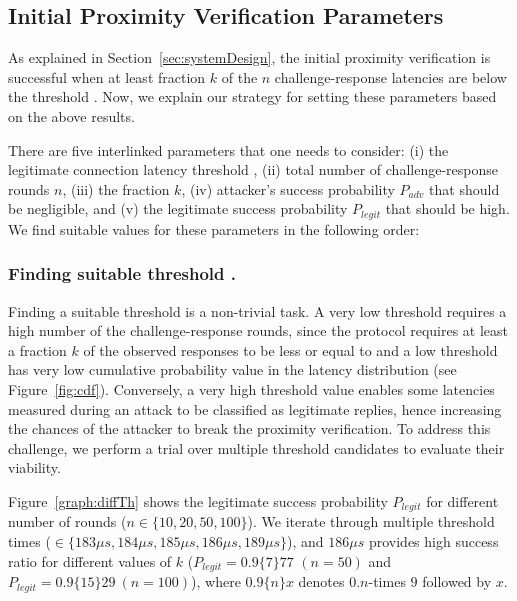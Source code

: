 \subsection{Initial Proximity Verification Parameters}
\label{sec:evaluation:parameters}

As explained in Section~\ref{sec:systemDesign}, the initial proximity verification is successful when at least fraction $k$ of the $n$ challenge-response latencies are below the threshold \connect.  Now, we explain our strategy for setting these parameters based on the above results.

There are five interlinked parameters that one needs to consider: (i) the legitimate connection latency threshold \connect, (ii) total number of challenge-response rounds $n$, (iii) the fraction $k$, (iv) attacker's success probability $P_{adv}$ that should be negligible, and (v) the legitimate success probability $P_{legit}$ that should be high. We find suitable values for these parameters in the following order:



\newcommand{\mainResultCaption}{\textbf{Distinguishing relay attack.} The attacker's success probability $P_{adv}$ and the legitimate success probability $P_{legit}$ in proximity verification for different number of rounds ($n$) given a fixed $k=0.4$.}


\subsubsection{Finding suitable threshold \connect.} Finding a suitable threshold \connect is a non-trivial task. A very low threshold requires a high number of the challenge-response rounds, since the protocol requires at least a fraction $k$ of the observed responses to be less or equal to \connect and a low threshold has very low cumulative probability value in the latency distribution (see Figure~\ref{fig:cdf}). Conversely, a very high threshold value enables some latencies measured during an attack to be classified as legitimate replies, hence increasing the chances of the attacker to break the proximity verification. To address this challenge, we perform a trial over multiple threshold candidates to evaluate their viability.


Figure~\ref{graph:diffTh} shows the legitimate success probability $P_{legit}$ for different number of rounds ($n\in\{10,20,50,100\}$). We iterate through multiple threshold times (\connect$\in\{183\mu s,184\mu s,185\mu s, 186\mu s, 189\mu s\}$), and $186\mu s$ provides high success ratio for different values of $k$ ($P_{legit}=0.9\{7\}77$ $(n=50)$ and $P_{legit}=0.9\{15\}29\ (n=100)$), where $0.9\{n\}x$ denotes $0.n$-times $9$ followed by $x$.

